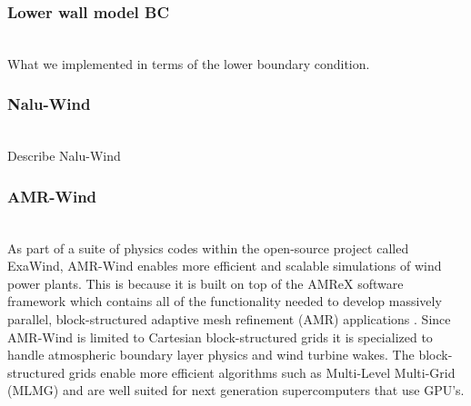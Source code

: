 \subsubsection{\label{sec:wallmodelBC}Lower wall model BC}
\\
What we implemented in terms of the lower boundary condition.

\subsubsection{Nalu-Wind}
\\
Describe Nalu-Wind

\subsubsection{AMR-Wind}

\\

As part of a suite of physics codes within the open-source project called ExaWind, 
AMR-Wind enables more efficient and scalable simulations of wind power plants. 
This is because it is built on top of the AMReX software framework which contains 
all of the functionality needed to develop massively parallel, block-structured 
adaptive mesh refinement (AMR) applications \cite{AMReX_JOSS}.
Since AMR-Wind is limited to Cartesian block-structured grids it is specialized
to handle atmospheric boundary layer physics and wind turbine wakes. 
The block-structured grids enable more efficient algorithms such as 
Multi-Level Multi-Grid (MLMG) \cite{AMReX_JOSS}
and are well suited for next generation supercomputers that use GPU's. 

